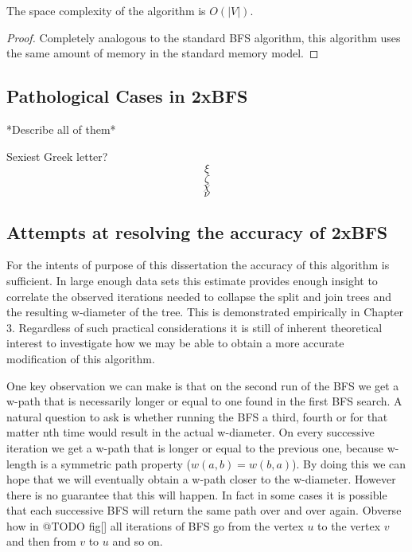 \begin{lem} The space complexity of the algorithm is $O(|V|)$. \end{lem}

\begin{proof}
    Completely analogous to the standard BFS algorithm, this algorithm uses the same amount of memory in the standard memory model.
\end{proof}

\subsection{Pathological Cases in 2xBFS}

*Describe all of them*

Sexiest Greek letter?
$$ \xi $$
$$ \zeta $$
$$ \chi $$
$$ \nu $$


\subsection{Attempts at resolving the accuracy of 2xBFS}



For the intents of purpose of this dissertation the accuracy of this algorithm is sufficient. In large enough data sets this estimate provides enough insight to correlate the observed iterations needed to collapse the split and join trees and the resulting w-diameter of the tree. This is demonstrated empirically in Chapter 3. Regardless of such practical considerations it is still of inherent theoretical interest to investigate how we may be able to obtain a more accurate modification of this algorithm.

One key observation we can make is that on the second run of the BFS we get a w-path that is necessarily longer or equal to one found in the first BFS search. A natural question to ask is whether running the BFS a third, fourth or for that matter nth time would result in the actual w-diameter. On every successive iteration we get a w-path that is longer or equal to the previous one, because w-length is a symmetric path property ($w(a, b) = w(b, a)$). By doing this we can hope that we will eventually obtain a w-path closer to the w-diameter. However there is no guarantee that this will happen. In fact in some cases it is possible that each successive BFS will return the same path over and over again. Obverse how in @TODO fig[] all iterations of BFS go from the vertex $u$ to the vertex $v$ and then from $v$ to $u$ and so on. 


